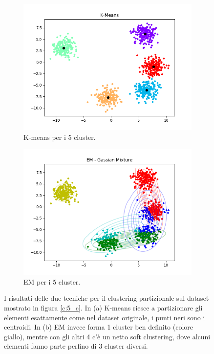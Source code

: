 \documentclass{llncs}
\begin{document}
	\begin{figure}[h]
		\centering
		\begin{subfigure}{.45\textwidth}
		  \centering
		  \includegraphics[width=\linewidth]{immagini/5_clusters_kmeans.png}
		  \caption{K-means per i 5 cluster.}
		  \label{part_norm:a}
		\end{subfigure}%
		\begin{subfigure}{.45\textwidth}
		  \centering
		  \includegraphics[width=\linewidth]{immagini/5_clusters_gmm.png}
		  \caption{EM per i 5 cluster.}
		  \label{part_norm:b}
		\end{subfigure}
		\caption{I risultati delle due tecniche per il clustering partizionale sul dataset mostrato in figura \ref{c:5_c}.
		In (a) K-means riesce a partizionare gli elementi esattamente come nel dataset originale, i punti neri sono i centroidi. In (b) EM invece forma 1 cluster ben definito (colore giallo), mentre con gli altri 4 c'è un
		netto soft clustering, dove alcuni elementi fanno parte perfino di 3 cluster diversi.}
		\label{part_norm:test}
	\end{figure}\\
\end{document}
